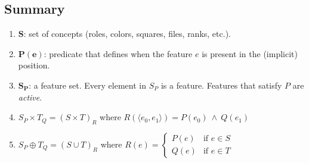 \subsection{Summary}

\begin{enumerate}
\item $\bm S$: set of concepts (roles, colors, squares, files, ranks, etc.).
\item $\bm{P(e)}$: predicate that defines when the feature $e$ is present in the (implicit) position.
\item ${\bm S}_{\bm P}$: a feature set. Every element in $S_P$ is a feature. Features that satisfy $P$ are \textit{active}.
\item $S_P \times T_Q={(S \times T)}_{R}$ where $R(\langle e_0, e_1 \rangle) = P(e_0)\ \land\ Q(e_1)$
\item $S_P \oplus T_Q={(S \cup T)}_R$ where $R(e) = \begin{cases}
        P(e) & \text{if } e \in S \\
        Q(e) & \text{if } e \in T
    \end{cases}
$

\end{enumerate}
